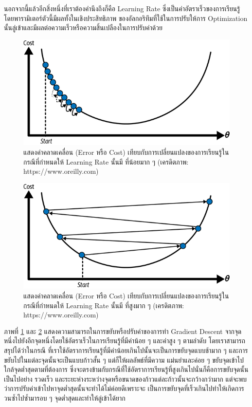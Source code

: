 นอกจากนี้แล้วอีกสิ่งหนึ่งที่เราต้องคำนึงถึงก็คือ Learning Rate ซึ่งเป็นค่าอัตราเร็วของการเรียนรู้ โดยพารามิเตอร์ตัวนี้มีผลทั้งในเชิงประสิทธิภาพ%
ของอัลกอริทึมที่ใช้ในการปรับให้การ Optimization นั้นลู่เข้าและมีผลต่อความเร็วหรือความสิ้นเปลืองในการปรับค่าด้วย

\begin{figure}[htbp]
    \centering
    \includegraphics[width=0.8\linewidth]{fig/learning_rate_small.png}
    \caption{แสดงค่าคลาดเคลื่อน (Error หรือ Cost) เทียบกับการเปลี่ยนแปลงของการเรียนรู้ในกรณีที่กำหนดให้ Learning Rate นั้นมี%
    ที่น้อยมาก ๆ (เครดิตภาพ: https://www.oreilly.com)}
    \label{fig:learning_rate_small}
\end{figure}

\begin{figure}[htbp]
    \centering
    \includegraphics[width=0.8\linewidth]{fig/learning_rate_high.png}
    \caption{แสดงค่าคลาดเคลื่อน (Error หรือ Cost) เทียบกับการเปลี่ยนแปลงของการเรียนรู้ในกรณีที่กำหนดให้ Learning Rate นั้นมี%
    ที่สูงมาก ๆ (เครดิตภาพ: https://www.oreilly.com)}
    \label{fig:learning_rate_high}
\end{figure}

ภาพที่ \ref{fig:learning_rate_small} และ \ref{fig:learning_rate_high} แสดงความสามารถในการขยับหรือปรับค่าของการทำ 
Gradient Descent จากจุดหนึ่งไปยังอีกจุดหนึ่งโดยใช้อัตราเร็วในการเรียนรู้ที่มีค่าน้อย ๆ และค่าสูง ๆ ตามลำดับ โดยเราสามารถสรุปได้ว่าในกรณี%
ที่เราใช้อัตราการเรียนรู้ที่มีค่าน้อยเกินไปนั้นจะเป็นการขยับจุดแบบช้ามาก ๆ และการขยับไปในแต่ละจุดนั้นจะเป็นแบบก้าวสั้น ๆ แต่ก็ให้ผลลัพธ์ที่มีความ%
แม่นยำและค่อย ๆ ขยับจุดเข้าไปใกล้จุดต่ำสุดตามที่ต้องการ ซึ่งจะตรงข้ามกับกรณีที่ใช้อัตราการเรียนรู้ที่สูงเกินไปนั่นก็คือการขยับจุดนั้นเป็นไปอย่าง%
รวดเร็ว และระยะห่างระหว่างจุดหรือขนาดของก้าวแต่ละก้าวนั้นจะกว้างกว่ามาก แต่จะพบว่าการปรับค่าเข้าไปหาจุดต่ำสุดนั้นจะทำได้ไม่ค่อยดีเพราะจะ%
เป็นการขยับจุดที่เร็วเกินไปทำให้เกิดการวนซ้ำไปซ้ำมารอบ ๆ จุดต่ำสุดและทำให้ลู่เข้าได้ยาก

